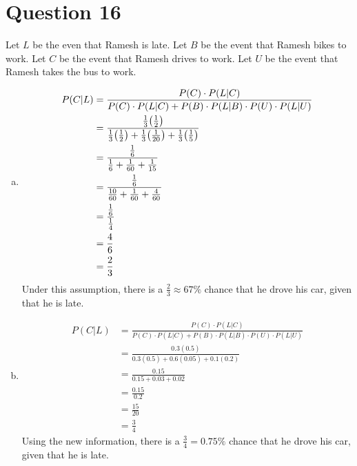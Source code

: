 \documentclass[article, 12pt]{article}
\title{\hwTitle}
\author{\name}
\date{%
    Due: \hwDueDate
}
\DeclarePairedDelimiter\paren{(}{)} %
\begin{document}
\section*{Question 16}
Let $L$ be the even that Ramesh is late. Let $B$ be the event that Ramesh bikes to work. Let $C$ be the event that Ramesh drives to work. Let $U$ be the event that Ramesh takes the bus to work. 
\begin{enumerate}[a)]
    \item
    \begin{align*}
        P(C|L) &= \frac{P(C) \cdot P(L|C)}{P(C) \cdot P(L|C) + P(B) \cdot P(L|B) \cdot P(U) \cdot P(L|U)} \\
               &= \frac{\frac{1}{3}\paren*{\frac{1}{2}}}{\frac{1}{3}\paren*{\frac{1}{2}} + \frac{1}{3}\paren*{\frac{1}{20}} + \frac{1}{3}\paren*{\frac{1}{5}}} \\
               &= \frac{\frac{1}{6}}{\frac{1}{6} + \frac{1}{60} + \frac{1}{15}} \\
               &= \frac{\frac{1}{6}}{\frac{10}{60} + \frac{1}{60} + \frac{4}{60}} \\
               &= \frac{\frac{1}{6}}{\frac{1}{4}} \\
               &= \frac{4}{6} \\
               &= \frac{2}{3}
    \end{align*}
    Under this assumption, there is a $\frac{2}{3} \approx 67\%$ chance that he drove his car, given that he is late.
    \item 
    \begin{align*}
        P(C|L) &= \frac{P(C) \cdot P(L|C)}{P(C) \cdot P(L|C) + P(B) \cdot P(L|B) \cdot P(U) \cdot P(L|U)} \\
               &= \frac{0.3(0.5)}{0.3(0.5) + 0.6(0.05) + 0.1(0.2)} \\
               &= \frac{0.15}{0.15 + 0.03 + 0.02} \\
               &= \frac{0.15}{0.2} \\
               &= \frac{15}{20} \\
               &= \frac{3}{4}
    \end{align*}
    Using the new information, there is a $\frac{3}{4} = 0.75\%$ chance that he drove his car, given that he is late.
\end{enumerate}
\end{document}
